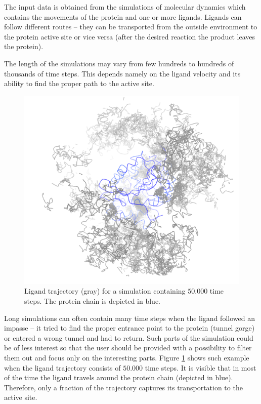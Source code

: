 \documentclass[twocolumn]{bmcart}%
\begin{document}
The input data is obtained from the simulations of molecular dynamics which contains the movements of the protein and one or more ligands.
Ligands can follow different routes -- they can be transported from the outside environment to the protein active site or vice versa (after the desired reaction the product leaves the protein).

The length of the simulations may vary from few hundreds to hundreds of thousands of time steps.  
This depends namely on the ligand velocity and its ability to find the proper path to the active site.

\begin{figure}[b!]
	\centering
  \includegraphics[width=0.95\linewidth]{img/lig_movement.png}
  \caption{\label{fig:lig_movement} Ligand trajectory (gray) for a simulation containing $50.000$ time steps. The protein chain is depicted in blue.}
\end{figure}

Long simulations can often contain many time steps when the ligand followed an impasse -- it tried to find the proper entrance point to the protein (tunnel gorge) or entered a wrong tunnel and had to return.
Such parts of the simulation could be of less interest so that the user should be provided with a possibility to filter them out and focus only on the interesting parts.
Figure \ref{fig:lig_movement} shows such example when the ligand trajectory consists of $50.000$ time steps. 
It is visible that in most of the time the ligand travels around the protein chain (depicted in blue).
Therefore, only a fraction of the trajectory captures its transportation to the active site.
\end{document}
